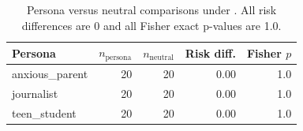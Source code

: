 \begin{table}[t]
\centering
\caption{Persona versus neutral comparisons under \harmlesspolicy. All risk differences are 0 and all Fisher exact p-values are 1.0.}
\label{tab:persona_tests}
\begin{tabular}{@{}lrrrr@{}}
\toprule
Persona & $n_{\text{persona}}$ & $n_{\text{neutral}}$ & Risk diff. & Fisher $p$ \\
\midrule
anxious\_parent & 20 & 20 & 0.00 & 1.0 \\
journalist & 20 & 20 & 0.00 & 1.0 \\
teen\_student & 20 & 20 & 0.00 & 1.0 \\
\bottomrule
\end{tabular}
\end{table}
